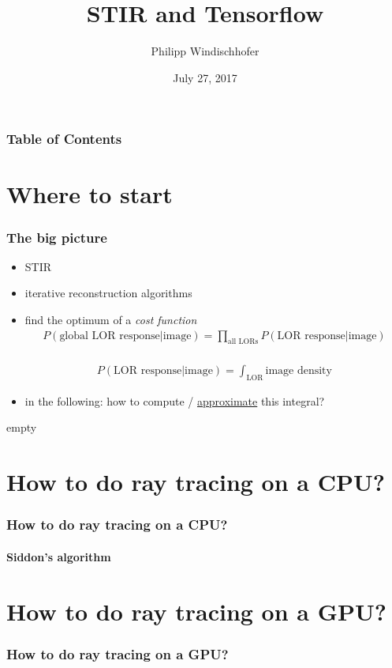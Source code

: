 \documentclass{beamer}
\title{STIR and Tensorflow}
\author{Philipp Windischhofer}
\date{July 27, 2017}
\begin{document}
 
\frame{\titlepage}

\begin{frame}
\frametitle{Table of Contents}
\tableofcontents
\end{frame}

\section{Where to start}
\begin{frame}
  \frametitle{The big picture}
  \begin{itemize}
    \item STIR
    \item iterative reconstruction algorithms
    \item find the optimum of a \textsl{cost function}\\
      \begin{align*} P(\text{global LOR response} | \text{image}) = \prod_{\text{all LORs}} P(\text{LOR response} | \text{image})\end{align*}\\
      \begin{align*} P(\text{LOR response} | \text{image}) = \int_{\text{LOR}} \text{image density}\end{align*}
    \item in the following: how to compute / \underline{approximate} this integral?
  \end{itemize}
\end{frame}

\begin{frame}
 empty
\end{frame}

\section{How to do ray tracing on a CPU?}
\begin{frame}
  \frametitle{How to do ray tracing on a CPU?}
  \framesubtitle{Siddon's algorithm}
\end{frame}

\section{How to do ray tracing on a GPU?}
\begin{frame}
  \frametitle{How to do ray tracing on a GPU?}
  
\end{frame}
\end{document}
